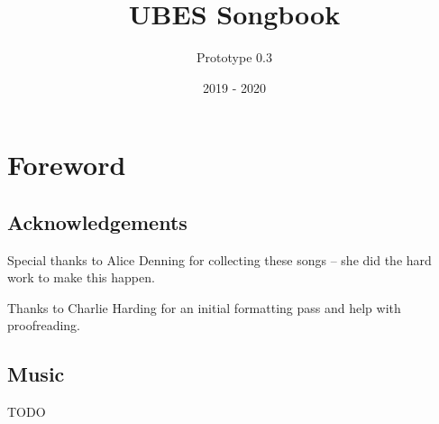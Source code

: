 \documentclass[9pt,twoside]{extarticle}
\title{UBES Songbook}
\author{Prototype 0.3}
\date{2019 - 2020}
\newcommand{\sectionbreak}{\clearpage}
\begin{document}
\raggedbottom
{}

\maketitle
\newpage

\section*{Foreword}

\subsection*{Acknowledgements}

\begin{center}
Special thanks to Alice Denning for collecting these songs -- she did the hard
work to make this happen.

Thanks to Charlie Harding for an initial formatting pass and help with
proofreading.
\end{center}

\subsection*{Music}

TODO

\newpage

\tableofcontents

\sectionbreak
{}
\end{document}

